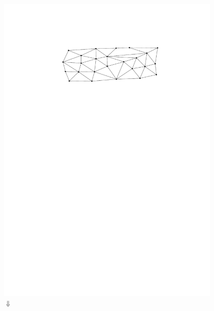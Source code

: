 \documentclass[a4paper,UKenglish,cleveref, autoref, thm-restate]{lipics-v2021}
\begin{document}
\begin{figure} [htbp]
  \centering
  \includegraphics[page=6]{figs/proper_good} \\
  $\Downarrow$ \\

\end{figure}
\end{document}
